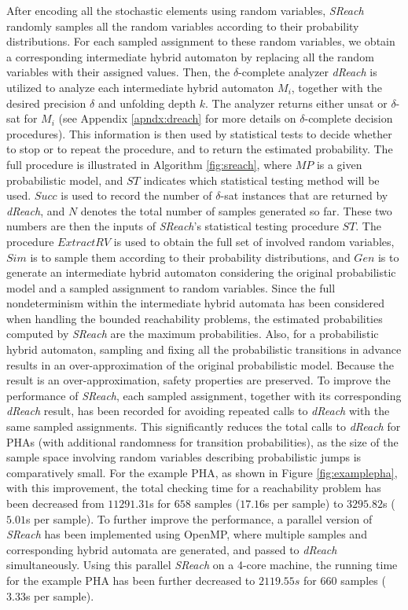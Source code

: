 \vspace{-.2cm}
After encoding all the stochastic elements using random variables, {\it SReach} randomly samples all the random variables according to their probability distributions. For each sampled assignment to these random variables, we obtain a corresponding intermediate hybrid automaton by replacing all the random variables with their assigned values. Then, the $\delta$-complete analyzer {\it dReach} \cite{gaodelta} is utilized to analyze each intermediate hybrid automaton $M_i$, together with the desired precision $\delta$ and unfolding depth $k$. The analyzer returns either unsat or $\delta$-sat for $M_i$ (see Appendix \ref{apndx:dreach} for more details on $\delta$-complete decision procedures). This information is then used by statistical tests to decide whether to stop or to repeat the procedure, and to return the estimated probability. The full procedure is illustrated in Algorithm \ref{fig:sreach}, where $MP$ is a given probabilistic model, and $ST$ indicates which statistical testing method will be used. $Succ$ is used to record the number of $\delta$-sat instances that are returned by {\it dReach}, and $N$ denotes the total number of samples generated so far. These two numbers are then the inputs of {\it SReach}'s statistical testing procedure $ST$. The procedure $ExtractRV$ is used to obtain the full set of involved random variables, $Sim$ is to sample them according to their probability distributions, and $Gen$ is to generate an intermediate hybrid automaton considering the original probabilistic model and a sampled assignment to random variables. Since the full nondeterminism within the intermediate hybrid automata has been considered when handling the bounded reachability problems, the estimated probabilities computed by {\it SReach} are the maximum probabilities. Also, for a probabilistic hybrid automaton, sampling and fixing all the probabilistic transitions in advance results in an over-approximation of the original probabilistic model. Because the result is an over-approximation, safety properties are preserved. To improve the performance of {\it SReach}, each sampled assignment, together with its corresponding {\it dReach} result, has been recorded for avoiding repeated calls to {\it dReach} with the same sampled assignments. This significantly reduces the total calls to {\it dReach} for PHAs (with additional randomness for transition probabilities), as the size of the sample space involving random variables describing probabilistic jumps is comparatively small. For the example PHA, as shown in Figure \ref{fig:examplepha}, with this improvement, the total checking time for a reachability problem has been decreased from $11291.31$s for $658$ samples ($17.16$s per sample) to $3295.82$s ($5.01$s per sample). To further improve the performance, a parallel version of {\it SReach} has been implemented using OpenMP, where multiple samples and corresponding hybrid automata are generated, and passed to {\it dReach} simultaneously. Using this parallel {\it SReach} on a 4-core machine, the running time for the example PHA has been further decreased to $2119.55s$ for $660$ samples ($3.33$s per sample). 
